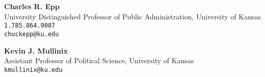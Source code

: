 \documentclass[margin,line,pifont,palatino,courier]{res}
\begin{document}
\begin{resume}
\textbf{Charles R. Epp} \\
University Distinguished Professor of Public Administration, University of Kansas \\
\verb+1.785.864.9087+\\
\texttt{chuckepp@ku.edu}

\textbf{Kevin J. Mullinix} \\
Assistant Professor of Political Science, University of Kansas \\
\texttt{kmullinix@ku.edu}\\

\end{resume}
\end{document}
